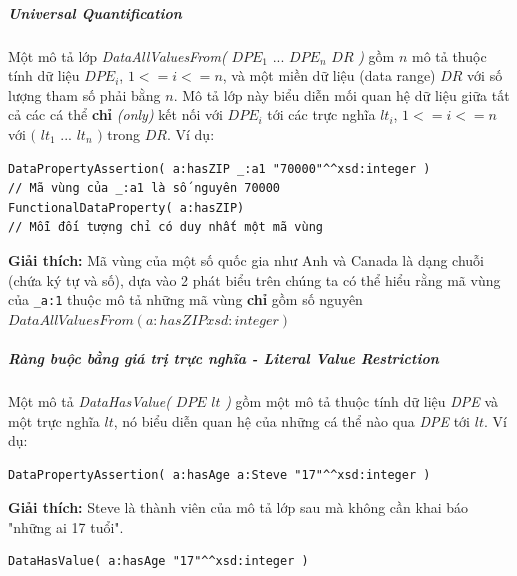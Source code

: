 \subparagraph{Universal Quantification} Một mô tả lớp \textit{DataAllValuesFrom(} $DPE_{1}$ ... $DPE_{n}$ $DR$ \textit{)} gồm $n$ mô tả thuộc tính dữ liệu $DPE_{i}$, $1<=i<=n$, và một miền dữ liệu (data range) $DR$ với số lượng tham số phải bằng $n$. Mô tả lớp này biểu diễn mối quan hệ dữ liệu giữa tất cả các cá thể \textbf{chỉ} \textit{(only)} kết nối với $DPE_{i}$ tới các trực nghĩa $lt_{i}$, $1<=i<=n$ với $($ $lt_{1}$ ... $lt_{n}$ $)$ trong $DR$. Ví dụ: 
\begin{verbatim}
DataPropertyAssertion( a:hasZIP _:a1 "70000"^^xsd:integer ) 
// Mã vùng của _:a1 là số nguyên 70000
FunctionalDataProperty( a:hasZIP) 
// Mỗi đối tượng chỉ có duy nhất một mã vùng
\end{verbatim}
\textbf{Giải thích:} Mã vùng của một số quốc gia như Anh và Canada là dạng chuỗi (chứa ký tự và số), dựa vào 2 phát biểu trên chúng ta có thể hiểu rằng mã vùng của \verb|_a:1| thuộc mô tả những mã vùng \textbf{chỉ} gồm số nguyên $DataAllValuesFrom( a:hasZIP xsd:integer )$

\subparagraph{Ràng buộc bằng giá trị trực nghĩa - Literal Value Restriction}
Một mô tả \textit{DataHasValue(} $DPE$ $lt$ \textit{)} gồm một mô tả thuộc tính dữ liệu \textit{DPE} và một trực nghĩa $lt$, nó biểu diễn quan hệ của những cá thể nào qua \textit{DPE} tới $lt$. Ví dụ:
\begin{verbatim}
DataPropertyAssertion( a:hasAge a:Steve "17"^^xsd:integer )
\end{verbatim}
\textbf{Giải thích:} Steve là thành viên của mô tả lớp sau mà không cần khai báo "những ai 17 tuổi".
\begin{verbatim}
DataHasValue( a:hasAge "17"^^xsd:integer )
\end{verbatim}

